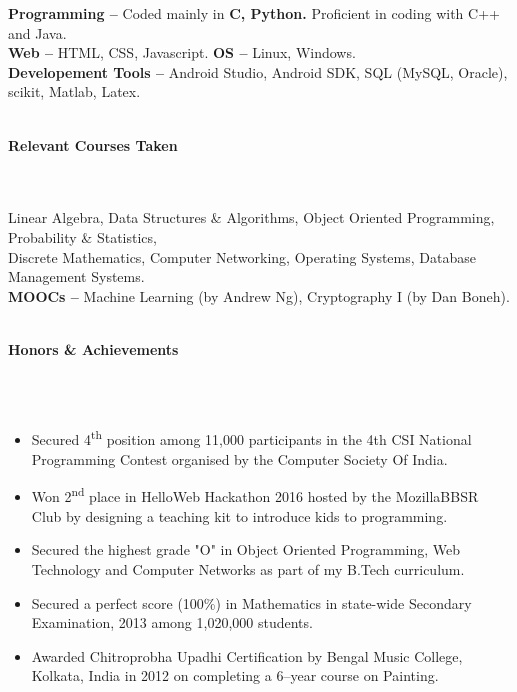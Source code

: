 \documentclass[a4paper,10pt]{article}
\newcommand{\lsep}{-0.5cm}
\newcommand{\resheading}[1]{{\large \colorbox{mygrey}{\begin{minipage}{0.99\textwidth}{\textbf{#1 \vphantom{p\^{E}}}}\end{minipage}}}}
\begin{document}
\indent\textbf{Programming -- }Coded mainly in \textbf{C, Python.} Proficient in coding with C++ and Java.\\
\indent\textbf{Web -- } HTML, CSS, Javascript. \indent\indent\textbf{OS -- } Linux, Windows.\\
\indent\textbf{Developement Tools --} Android Studio, Android SDK, SQL (MySQL, Oracle), scikit, Matlab, Latex.\\\\


\resheading{\textbf{Relevant Courses Taken} }\\\\[\lsep]

\indent Linear Algebra, Data Structures \& Algorithms, Object Oriented Programming, Probability \& Statistics,\\
\indent Discrete Mathematics, Computer Networking, Operating Systems, Database Management Systems.\\
\indent\textbf{MOOCs -- }Machine Learning (by Andrew Ng), Cryptography I (by Dan Boneh).\\
\\


\resheading{\textbf{Honors \& Achievements}}\\[\lsep]\\[-0.2cm]
\begin{itemize}
\item {Secured 4\textsuperscript{th} position among 11,000 participants in the 4th CSI National Programming Contest organised by the Computer Society Of India.}
\item {Won 2\textsuperscript{nd} place in HelloWeb Hackathon 2016 hosted by the MozillaBBSR Club by designing a teaching kit to introduce kids to programming.}
\item {Secured the highest grade "O" in Object Oriented Programming, Web Technology and Computer Networks as part of my B.Tech curriculum. }
\item {Secured a perfect score (100\%) in Mathematics in state-wide Secondary Examination, 2013 among 1,020,000 students.}
\item {Awarded Chitroprobha Upadhi Certification by Bengal Music College, Kolkata, India in 2012 on completing a 6--year course on Painting.}
\end{itemize}
\end{document}
